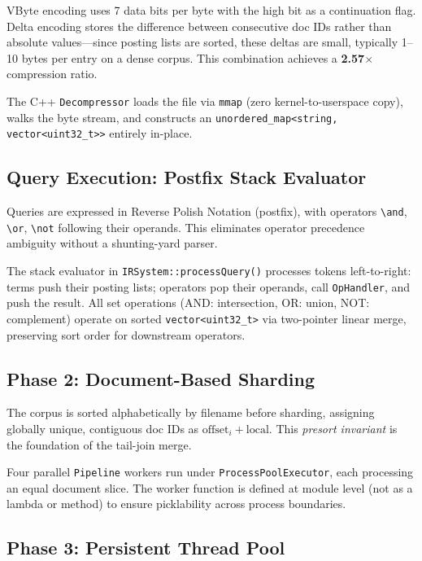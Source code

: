 \documentclass[twocolumn, 10pt]{article}
\begin{document}
VByte encoding uses 7 data bits per byte with the high bit as a
continuation flag. Delta encoding stores the difference between consecutive
doc IDs rather than absolute values---since posting lists are sorted, these
deltas are small, typically 1--10 bytes per entry on a dense corpus.
This combination achieves a \textbf{2.57$\times$} compression ratio.

The C++ \texttt{Decompressor} loads the file via \texttt{mmap} (zero
kernel-to-userspace copy), walks the byte stream, and constructs an
\texttt{unordered\_map<string, vector<uint32\_t>>} entirely in-place.

\subsection{Query Execution: Postfix Stack Evaluator}

Queries are expressed in Reverse Polish Notation (postfix), with operators
\texttt{\textbackslash and}, \texttt{\textbackslash or},
\texttt{\textbackslash not} following their operands. This eliminates
operator precedence ambiguity without a shunting-yard parser.

The stack evaluator in \texttt{IRSystem::processQuery()} processes tokens
left-to-right: terms push their posting lists; operators pop their
operands, call \texttt{OpHandler}, and push the result. All set operations
(AND: intersection, OR: union, NOT: complement) operate on sorted
\texttt{vector<uint32\_t>} via two-pointer linear merge, preserving sort
order for downstream operators.

\subsection{Phase 2: Document-Based Sharding}

The corpus is sorted alphabetically by filename before sharding, assigning
globally unique, contiguous doc IDs as $\text{offset}_i + \text{local}$.
This \textit{presort invariant} is the foundation of the tail-join merge.

Four parallel \texttt{Pipeline} workers run under
\texttt{ProcessPoolExecutor}, each processing an equal document slice.
The worker function is defined at module level (not as a lambda or method)
to ensure picklability across process boundaries.

\subsection{Phase 3: Persistent Thread Pool}
\end{document}
